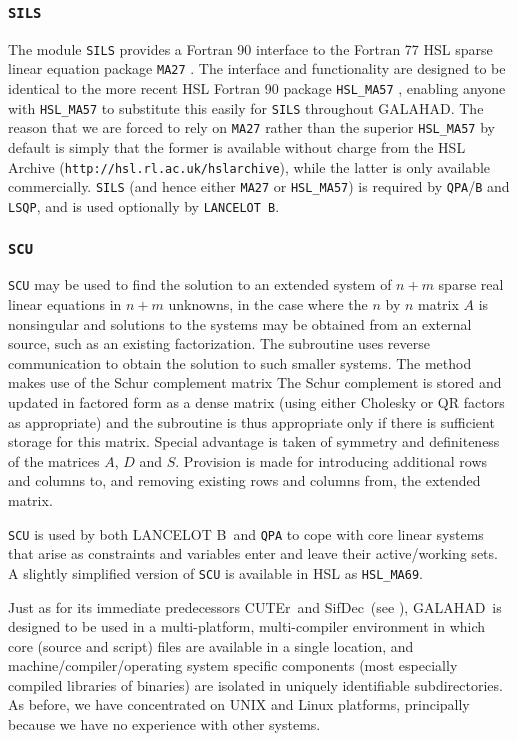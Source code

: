\documentclass[twoside]{article}
\newcommand{\gal}{{\sf GALAHAD}}
\newcommand{\lanb}{{\sf LANCELOT B}}
\newcommand{\cuter}{{\sf CUTEr}}
\newcommand{\sifdec}{{\sf SifDec}}
\newcommand{\ltsubsubsection}[1]{\subsubsection{{\tt #1}} \label{#1}}
\begin{document}
\ltsubsubsection{SILS}

The module {\tt SILS} provides a Fortran 90 interface to the Fortran 77 HSL
sparse linear equation package {\tt MA27} \cite{DuffReid82}. 
The interface and functionality are 
designed to be identical to the more recent HSL Fortran 90 
package {\tt HSL\_MA57} \cite{Duff01}, enabling anyone with {\tt HSL\_MA57}
to substitute this easily for {\tt SILS} throughout \gal. The reason
that we are forced to rely on {\tt MA27} rather than the superior 
{\tt HSL\_MA57} by default is simply that
the former is available without charge from the HSL Archive
({\tt http://hsl.rl.ac.uk/hslarchive}), while the latter is only available
commercially.
{\tt SILS} (and hence either {\tt MA27} or {\tt HSL\_MA57}) 
is required by {\tt QPA}/{\tt B} and {\tt LSQP}, and is
used optionally by {\tt LANCELOT B}.

\ltsubsubsection{SCU}

{\tt SCU} may be used to find the solution
to an extended system of $n + m$ 
sparse real linear equations in $n  +  m$ unknowns,
in the case where the $n$ by $n$ matrix $A$ is nonsingular 
and solutions to the systems 
may be obtained from an external source, such as an existing 
factorization.  The subroutine uses reverse communication to obtain 
the solution to such smaller systems.  The method makes use of 
the Schur complement matrix 
The Schur complement is stored and updated in factored form as a dense matrix 
(using either Cholesky or QR factors as appropriate)
and the subroutine is thus appropriate only if there is 
sufficient storage for this matrix. Special advantage is taken 
of symmetry and definiteness of the matrices $A$, $D$ and $S$. 
Provision is made for introducing additional rows and columns 
to, and removing existing rows and columns from, the extended matrix. 

{\tt SCU} is used by both \lanb\ and {\tt QPA} to cope
with core linear systems that arise as constraints and variables
enter and leave their active/working sets. A slightly simplified
version of {\tt SCU} is available in HSL as {\tt HSL\_MA69}.


Just as for its immediate predecessors \cuter\ and \sifdec\
(see ),
\gal\ is designed to be used in a multi-platform, multi-compiler 
environment in which core (source and script) files are available
in a single location, and machine/compiler/operating system specific
components (most especially compiled libraries of binaries) are isolated in
uniquely identifiable subdirectories. As before, we have concentrated on 
UNIX and Linux platforms, principally because we have no experience with 
other systems.
\end{document}
